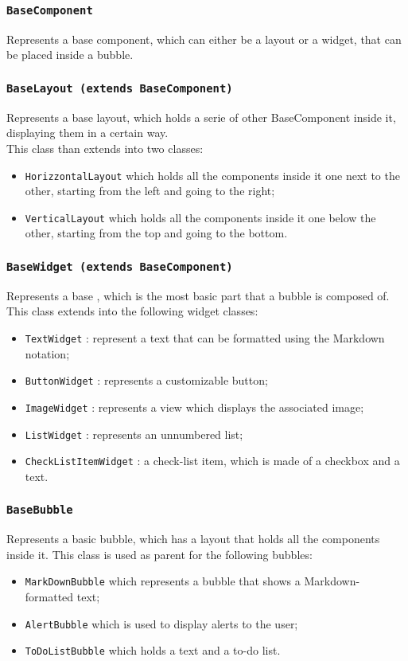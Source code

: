 \subsubsection{\texttt{BaseComponent}}
Represents a base component, which can either be a layout or a widget, that can be placed inside a bubble.

\subsubsection{\texttt{BaseLayout (extends BaseComponent)}}
Represents a base layout, which holds a serie of other BaseComponent inside it, displaying them in a certain way. \\
This class than extends into two classes:
\begin{itemize}
	\item \texttt{HorizzontalLayout} which holds all the components inside it one next to the other, starting from the left and going to the right;
	\item \texttt{VerticalLayout} which holds all the components inside it one below the other, starting from the top and going to the bottom.
\end{itemize}


\subsubsection{\texttt{BaseWidget (extends BaseComponent)}}
Represents a base , which is the most basic part that a bubble is composed of.
This class extends into the following widget classes:
\begin{itemize}
	\item \texttt{TextWidget} : represent a text that can be formatted using the Markdown notation;
	\item \texttt{ButtonWidget} : represents a customizable button;
	\item \texttt{ImageWidget} : represents a view which displays the associated image;
	\item \texttt{ListWidget} : represents an unnumbered list;
	\item \texttt{CheckListItemWidget} : a check-list item, which is made of a checkbox and a text.
\end{itemize}

\subsubsection{\texttt{BaseBubble}}
Represents a basic bubble, which has a layout that holds all the components inside it.
This class is used as parent for the following bubbles:
\begin{itemize}
	\item \texttt{MarkDownBubble} which represents a bubble that shows a Markdown-formatted text;
	\item \texttt{AlertBubble} which is used to display alerts to the user;
	\item \texttt{ToDoListBubble} which holds a text and a to-do list.
\end{itemize}

\newpage






